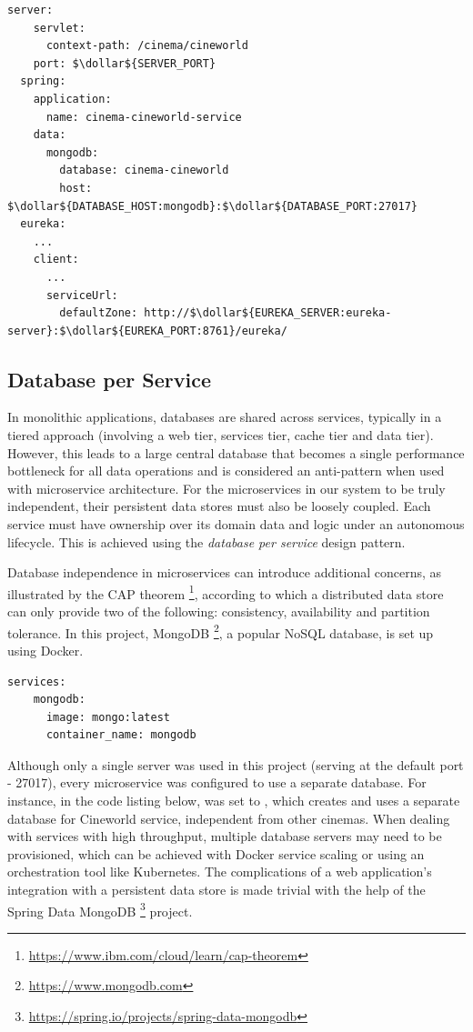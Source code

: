 \begin{lstlisting}[caption=Snippet from \code{cinema-cineworld-service} \code{application.yml} file.]
  server:
    servlet:
      context-path: /cinema/cineworld
    port: $\dollar${SERVER_PORT}
  spring:
    application:
      name: cinema-cineworld-service
    data:
      mongodb:
        database: cinema-cineworld
        host: $\dollar${DATABASE_HOST:mongodb}:$\dollar${DATABASE_PORT:27017}
  eureka:
    ...
    client:
      ...
      serviceUrl:
        defaultZone: http://$\dollar${EUREKA_SERVER:eureka-server}:$\dollar${EUREKA_PORT:8761}/eureka/
\end{lstlisting}

\subsection{Database per Service}

In monolithic applications, databases are shared across services, typically in a tiered approach (involving a web tier, services tier, cache tier and data tier). However, this leads to a large central database that becomes a single performance bottleneck for all data operations and is considered an anti-pattern when used with microservice architecture. For the microservices in our system to be truly independent, their persistent data stores must also be loosely coupled. Each service must have ownership over its domain data and logic under an autonomous lifecycle. This is achieved using the \textit{database per service} design pattern.

Database independence in microservices can introduce additional concerns, as illustrated by the CAP theorem \footnote{\url{https://www.ibm.com/cloud/learn/cap-theorem}}, according to which a distributed data store can only provide two of the following: consistency, availability and partition tolerance. In this project, MongoDB \footnote{\url{https://www.mongodb.com}}, a popular NoSQL database, is set up using Docker.

\begin{lstlisting}[caption=Docker Compose file snippet for MongoDB server.]
  services:
    mongodb:
      image: mongo:latest
      container_name: mongodb
\end{lstlisting}

Although only a single server was used in this project (serving at the default port - 27017), every microservice was configured to use a separate database. For instance, in the code listing below,  was set to , which creates and uses a separate database for Cineworld service, independent from other cinemas. When dealing with services with high throughput, multiple database servers may need to be provisioned, which can be achieved with Docker service scaling or using an orchestration tool like Kubernetes. The complications of a web application's integration with a persistent data store is made trivial with the help of the Spring Data MongoDB \footnote{\url{https://spring.io/projects/spring-data-mongodb}} project.

